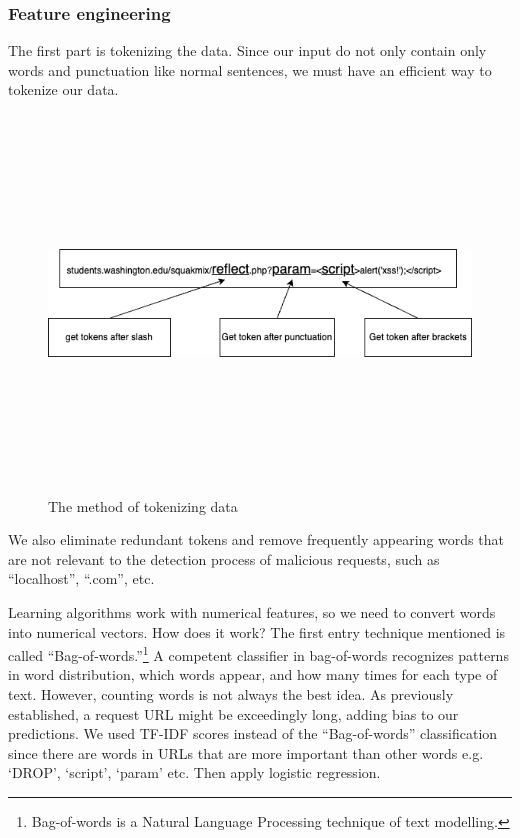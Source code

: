 \subsubsection{Feature engineering}
\hspace{0.5cm}The first part is tokenizing the data. Since our input do not only contain only words and punctuation like normal sentences, we must have an efficient way to tokenize our data.

\begin{figure}[!h]
	\centering
	\includegraphics[width=\linewidth, height=10cm,keepaspectratio]{figures/implement1.png}
  \caption{The method of tokenizing data}
\end{figure} 

\newpage
We also eliminate redundant tokens and remove frequently appearing words that are not relevant to the detection process of malicious requests, such as ``localhost'', ``.com'', etc.

Learning algorithms work with numerical features, so we need to convert words into numerical vectors. How does it work? The first entry technique mentioned is called ``Bag-of-words.''\footnote{Bag-of-words is a Natural Language Processing technique of text modelling.}
A competent classifier in bag-of-words recognizes patterns in word distribution, which words appear, and how many times for each type of text. However, counting words is not always the best idea. As previously established, a request URL might be exceedingly long, adding bias to our predictions. We used TF-IDF scores instead of the ``Bag-of-words'' classification since there are words in URLs that are more important than other words e.g. `DROP', `script', `param' etc. Then apply logistic regression.

